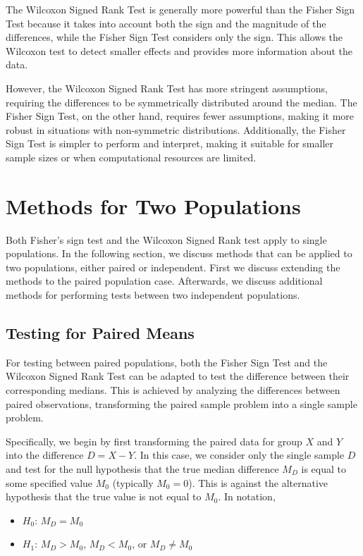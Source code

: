 \documentclass{article}
\begin{document}
The Wilcoxon Signed Rank Test is generally more powerful than the Fisher Sign Test because it takes into account both the sign and the magnitude of the differences, while the Fisher Sign Test considers only the sign. This allows the Wilcoxon test to detect smaller effects and provides more information about the data.

However, the Wilcoxon Signed Rank Test has more stringent assumptions, requiring the differences to be symmetrically distributed around the median. The Fisher Sign Test, on the other hand, requires fewer assumptions, making it more robust in situations with non-symmetric distributions. Additionally, the Fisher Sign Test is simpler to perform and interpret, making it suitable for smaller sample sizes or when computational resources are limited.

\section{Methods for Two Populations}

Both Fisher's sign test and the Wilcoxon Signed Rank test apply to single populations. In the following section, we discuss methods that can be applied to two populations, either paired or independent. First we discuss extending the methods to the paired population case. Afterwards, we discuss additional methods for performing tests between two independent populations.

\subsection{Testing for Paired Means}

For testing between paired populations, both the Fisher Sign Test and the Wilcoxon Signed Rank Test can be adapted to test the difference between their corresponding medians. This is achieved by analyzing the differences between paired observations, transforming the paired sample problem into a single sample problem.

Specifically, we begin by first transforming the paired data for group $X$ and $Y$ into the difference $D = X - Y$. In this case, we consider only the single sample $D$ and test for the null hypothesis that the true median difference $M_D$ is equal to some specified value $M_0$ (typically $M_0 = 0$). This is against the alternative hypothesis that the true value is not equal to $M_0$. In notation,

\begin{itemize}
    \item $H_0$: $M_D = M_0$
    \item $H_1$: $M_D > M_0$, $M_D < M_0$, or $M_D \neq M_0$
\end{itemize}
\end{document}
